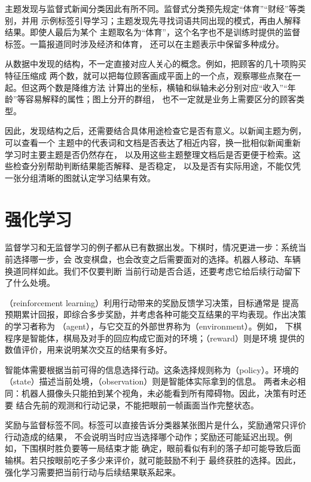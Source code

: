 主题发现与监督式新闻分类因此有所不同。监督式分类预先规定“体育”“财经”等类别，并用
示例标签引导学习；主题发现先寻找词语共同出现的模式，再由人解释结果。即使人最后为某个
主题取名为“体育”，这个名字也不是训练时提供的监督标签。一篇报道同时涉及经济和体育，
还可以在主题表示中保留多种成分。

从数据中发现的结构，不一定直接对应人关心的概念。例如，把顾客的几十项购买特征压缩成
两个数，就可以把每位顾客画成平面上的一个点，观察哪些点聚在一起。但这两个数是降维方法
计算出的坐标，横轴和纵轴未必分别对应“收入”“年龄”等容易解释的属性；图上分开的群组，
也不一定就是业务上需要区分的顾客类型。

因此，发现结构之后，还需要结合具体用途检查它是否有意义。以新闻主题为例，可以查看一个
主题中的代表词和文档是否表达了相近内容，换一批相似新闻重新学习时主要主题是否仍然存在，
以及用这些主题整理文档后是否更便于检索。这些检查分别帮助判断结果能否解释、是否稳定，
以及是否有实际用途，不能仅凭一张分组清晰的图就认定学习结果有效。

\section{强化学习}
\label{sec:reinforcement-learning}

监督学习和无监督学习的例子都从已有数据出发。下棋时，情况更进一步：系统当前选择哪一步，会
改变棋盘，也会改变之后需要面对的选择。机器人移动、车辆换道同样如此。我们不仅要判断
当前行动是否合适，还要考虑它给后续行动留下了什么处境。

（reinforcement learning）利用行动带来的奖励反馈学习决策，目标通常是
提高预期累计回报，即综合多步奖励，并考虑各种可能交互结果的平均表现。作出决策的学习者称为
（agent），与它交互的外部世界称为（environment）。例如，
下棋程序是智能体，棋局及对手的回应构成它面对的环境；（reward）则是环境
提供的数值评价，用来说明某次交互的结果有多好。

智能体需要根据当前可得的信息选择行动。这条选择规则称为（policy）。环境的
（state）描述当前处境，（observation）则是智能体实际拿到的信息。
两者未必相同：机器人摄像头只能拍到某个视角，未必能看到所有障碍物。因此，决策有时还要
结合先前的观测和行动记录，不能把眼前一帧画面当作完整状态。

奖励与监督标签不同。标签可以直接告诉分类器某张图片是什么，奖励通常只评价行动造成的结果，
不会说明当时应当选择哪个动作；奖励还可能延迟出现。例如，下围棋时胜负要等一局结束才能
确定，眼前看似有利的落子却可能导致后面输棋。若只按眼前吃子多少来评价，就可能鼓励不利于
最终获胜的选择。因此，强化学习需要把当前行动与后续结果联系起来。

